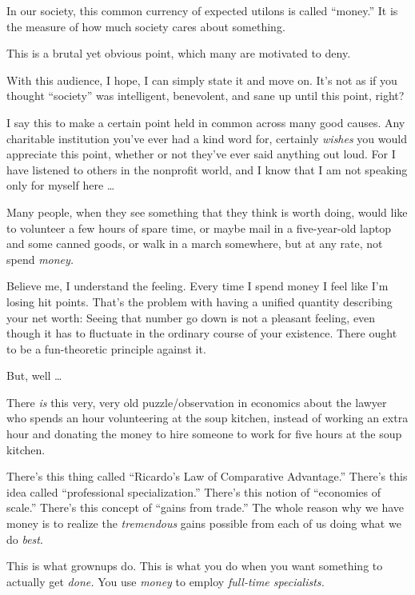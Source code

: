 {
 In our society, this common currency of expected utilons is called
``money.'' It is the measure of how
much society cares about something.}

{
 This is a brutal yet obvious point, which many are motivated to
deny.}

{
 With this audience, I hope, I can simply state it and move on.
It's not as if you thought
``society'' was intelligent,
benevolent, and sane up until this point, right?}

{
 I say this to make a certain point held in common across many good
causes. Any charitable institution you've ever had a
kind word for, certainly \textit{wishes} you would appreciate this
point, whether or not they've ever said anything out
loud. For I have listened to others in the nonprofit world, and I know
that I am not speaking only for myself here \ldots}

{
 Many people, when they see something that they think is worth
doing, would like to volunteer a few hours of spare time, or maybe mail
in a five-year-old laptop and some canned goods, or walk in a march
somewhere, but at any rate, not spend \textit{money.}}

{
 Believe me, I understand the feeling. Every time I spend money I
feel like I'm losing hit points. That's
the problem with having a unified quantity describing your net worth:
Seeing that number go down is not a pleasant feeling, even though it
has to fluctuate in the ordinary course of your existence. There ought
to be a fun-theoretic principle against it.}

{
 But, well \ldots}

{
 There \textit{is} this very, very old puzzle/observation in
economics about the lawyer who spends an hour volunteering at the soup
kitchen, instead of working an extra hour and donating the money to
hire someone to work for five hours at the soup kitchen.}

{
 There's this thing called
``Ricardo's Law of Comparative
Advantage.'' There's this idea called
``professional specialization.''
There's this notion of ``economies of
scale.'' There's this concept of
``gains from trade.'' The whole
reason why we have money is to realize the \textit{tremendous} gains
possible from each of us doing what we do \textit{best}.}

{
 This is what grownups do. This is what you do when you want
something to actually get \textit{done.} You use \textit{money} to
employ \textit{full-time specialists.}}

